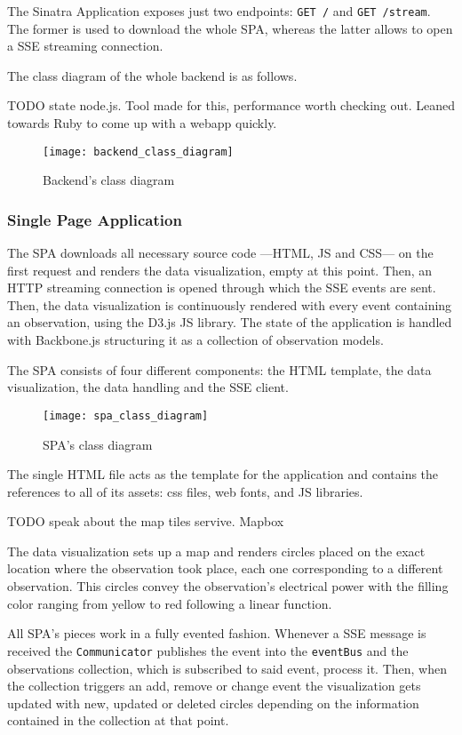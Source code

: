 The Sinatra Application exposes just two endpoints: \texttt{GET /} and \texttt{GET /stream}. The former is used to download the whole SPA, whereas the latter allows to open a SSE streaming connection.

The class diagram of the whole backend is as follows.

TODO state node.js. Tool made for this, performance worth checking out. Leaned towards Ruby to come up with a webapp quickly.

\begin{figure}[H]
	\centering
	\texttt{[image: backend\_class\_diagram]}
	\caption{Backend's class diagram}
	\label{fig:backend_class_diagram}
\end{figure}

\subsubsection{Single Page Application}

The SPA downloads all necessary source code ---HTML, JS and CSS--- on the first request and renders the data visualization, empty at this point. Then, an HTTP streaming connection is opened  through which the SSE events are sent. Then, the data visualization is continuously rendered with every event containing an observation, using the D3.js JS library. The state of the application is handled with Backbone.js structuring it as a collection of observation models.

The SPA consists of four different components: the HTML template, the data visualization, the data handling and the SSE client.

\begin{figure}[p]
	\centering
	\texttt{[image: spa\_class\_diagram]}
	\caption{SPA's class diagram}
	\label{fig:spa_class_diagram}
\end{figure}

The single HTML file acts as the template for the application and contains the references to all of its assets: css files, web fonts, and JS libraries.

TODO speak about the map tiles servive. Mapbox

The data visualization sets up a map and renders circles placed on the exact location where the observation took place, each one corresponding to a different observation. This circles convey the observation's electrical power with the filling color ranging from yellow to red following a linear function.

All SPA's pieces work in a fully evented fashion. Whenever a SSE message is received the \texttt{Communicator} publishes the event into the \texttt{eventBus} and the observations collection, which is subscribed to said event, process it. Then, when the collection triggers an add, remove or change event the visualization gets updated with new, updated or deleted circles depending on the information contained in the collection at that point.